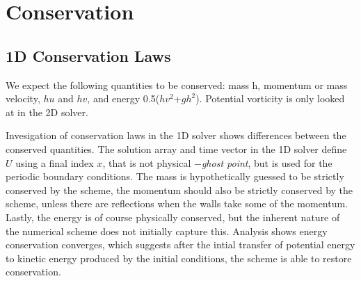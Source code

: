\section{Conservation}


\subsection{1D Conservation Laws}
We expect the following quantities to be conserved: mass h, momentum or mass velocity, $hu$ and $hv$, and
energy 0.5($hv^2$+$gh^2$). Potential vorticity is only looked at in the 2D solver. 
\newline

Invesigation of conservation laws in the 1D solver shows differences
between the conserved quantities. The solution array and time vector in the 1D solver define $U$ using
 a final index $x$, that is not physical $-$\textit{ghost point}, but is used for the periodic boundary 
 conditions. The mass is hypothetically guessed to be strictly conserved by the scheme, the momentum should also
 be strictly conserved by the scheme, unless there are reflections when the walls take some of the momentum. Lastly,
 the energy is of course physically conserved, but the inherent nature of the numerical scheme does not initially
capture this. Analysis shows energy conservation converges, which suggests after the intial transfer of potential energy
to kinetic energy produced by the initial conditions, the scheme is able to restore conservation. 
\newline


